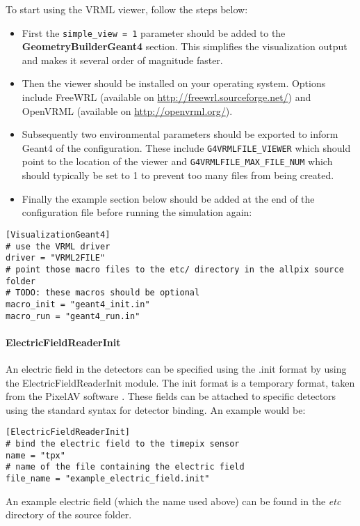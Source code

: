 To start using the VRML viewer, follow the steps below:
\begin{itemize}
\item First the \texttt{simple\_view = 1} parameter should be added to the \textbf{GeometryBuilderGeant4} section. This simplifies the visualization output and makes it several order of magnitude faster. 
\item Then the viewer should be installed on your operating system. Options include FreeWRL (available on \url{http://freewrl.sourceforge.net/}) and OpenVRML (available on \url{http://openvrml.org/}).
\item Subsequently two environmental parameters should be exported to inform Geant4 of the configuration. These include \texttt{G4VRMLFILE\_VIEWER} which should point to the location of the viewer and \texttt{G4VRMLFILE\_MAX\_FILE\_NUM} which should typically be set to 1 to prevent too many files from being created.
\item Finally the example section below should be added at the end of the configuration file before running the simulation again:
\end{itemize}

\begin{verbatim}
[VisualizationGeant4]
# use the VRML driver
driver = "VRML2FILE" 
# point those macro files to the etc/ directory in the allpix source folder
# TODO: these macros should be optional
macro_init = "geant4_init.in"
macro_run = "geant4_run.in"
\end{verbatim}

\paragraph{ElectricFieldReaderInit}
An electric field in the detectors can be specified using the .init format by using the ElectricFieldReaderInit module. The init format is a temporary format, taken from the PixelAV software\cite{pixelavgit} . These fields can be attached to specific detectors using the standard syntax for detector binding. An example would be:
\begin{verbatim}
[ElectricFieldReaderInit]
# bind the electric field to the timepix sensor
name = "tpx"
# name of the file containing the electric field
file_name = "example_electric_field.init"
\end{verbatim}
An example electric field (which the name used above) can be found in the \textit{etc} directory of the \apsq source folder.


